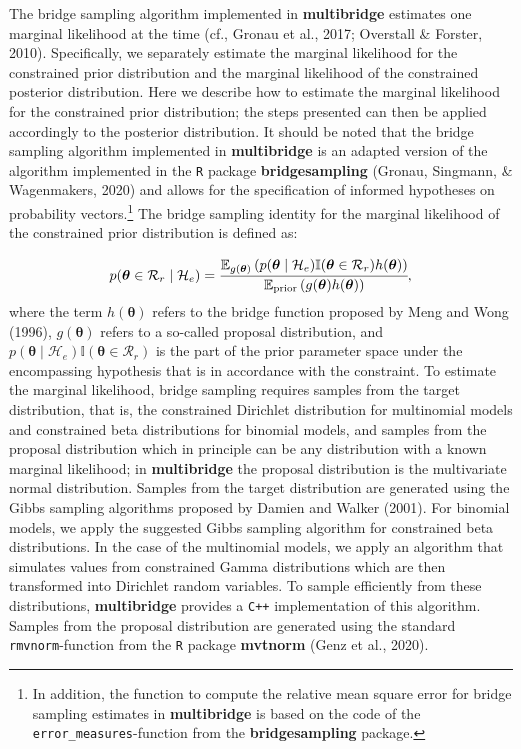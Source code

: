 \documentclass[
  english,
  man,floatsintext]{apa6}
\begin{document}
The bridge sampling algorithm implemented in \textbf{multibridge} estimates one marginal likelihood at the time (cf., Gronau et al., 2017; Overstall \& Forster, 2010). Specifically, we separately estimate the marginal likelihood for the constrained prior distribution and the marginal likelihood of the constrained posterior distribution. Here we describe how to estimate the marginal likelihood for the constrained prior distribution; the steps presented can then be applied accordingly to the posterior distribution. It should be noted that the bridge sampling algorithm implemented in \textbf{multibridge} is an adapted version of the algorithm implemented in the \texttt{R} package \textbf{bridgesampling} (Gronau, Singmann, \& Wagenmakers, 2020) and allows for the specification of informed hypotheses on probability vectors.\footnote{In addition, the function to compute the relative mean square error for bridge sampling estimates in \textbf{multibridge} is based on the code of the \texttt{error\_measures}-function from the \textbf{bridgesampling} package.} The bridge sampling identity for the marginal likelihood of the constrained prior distribution is defined as:

\begin{align}
    p(\boldsymbol{\theta} \in \mathcal{R}_r \mid \mathcal{H}_e) = \cfrac{\mathbb{E}_{g(\boldsymbol{\theta})}\left(p(\boldsymbol{\theta}\mid \mathcal{H}_e) \mathbb{I}(\boldsymbol{\theta}\in\mathcal{R}_r)h(\boldsymbol{\theta})\right)}{\mathbb{E}_{\text{prior}} \left(g(\boldsymbol{\theta})h(\boldsymbol{\theta})\right)},
    \label{Eq:bridgeidentity}
\end{align}
where the term \(h(\boldsymbol{\theta})\) refers to the bridge function proposed by Meng and Wong (1996), \(g(\boldsymbol{\theta})\) refers to a so-called proposal distribution, and \(p(\boldsymbol{\theta}\mid \mathcal{H}_e) \mathbb{I}(\boldsymbol{\theta}\in\mathcal{R}_r)\) is the part of the prior parameter space under the encompassing hypothesis that is in accordance with the constraint. To estimate the marginal likelihood, bridge sampling requires samples from the target distribution, that is, the constrained Dirichlet distribution for multinomial models and constrained beta distributions for binomial models, and samples from the proposal distribution which in principle can be any distribution with a known marginal likelihood; in \textbf{multibridge} the proposal distribution is the multivariate normal distribution. Samples from the target distribution are generated using the Gibbs sampling algorithms proposed by Damien and Walker (2001). For binomial models, we apply the suggested Gibbs sampling algorithm for constrained beta distributions. In the case of the multinomial models, we apply an algorithm that simulates values from constrained Gamma distributions which are then transformed into Dirichlet random variables. To sample efficiently from these distributions, \textbf{multibridge} provides a \texttt{C++} implementation of this algorithm. Samples from the proposal distribution are generated using the standard \texttt{rmvnorm}-function from the \texttt{R} package \textbf{mvtnorm} (Genz et al., 2020).
\end{document}
